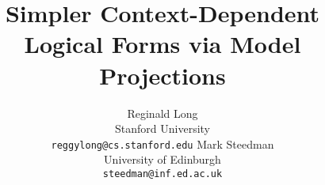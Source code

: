 \documentclass[11pt]{article}
\title{Simpler Context-Dependent Logical Forms via Model Projections}
\author{
  Reginald Long \\
  Stanford University \\
  {\small \tt{reggylong@cs.stanford.edu}}
\And
  Mark Steedman \\
  University of Edinburgh \\
  {\small \tt{steedman@inf.ed.ac.uk}}
}
\date{}
\begin{document}
\maketitle

\begin{abstract}
  
\end{abstract}











\end{document}
